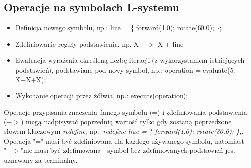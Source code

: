 \documentclass{article}
\begin{document}
\subsection{Operacje na symbolach L-systemu}
\begin{itemize}
    \item{Definicja nowego symbolu, np.: line = \{ forward(1.0); rotate(60.0); \};}
    \item{Zdefiniowanie reguły podstawienia, np. X $-$$>$ X + line;}
    \item{Ewaluacja wyrażenia określoną liczbę iteracji (z wykorzystaniem istniejących podstawień), podstawiane pod nowy symbol, np.: operation = evaluate(5, X+X+X);}
    \item{Wykonanie operacji przez żółwia, np.: execute(operation);}
\end{itemize}
Operacje przypisania znaczenia danego symbolu (=) i zdefiniowania podstawienia ($-$$>$) mogą nadpisywać poprzednią wartość tylko gdy zostaną poprzedzone słowem kluczowym \textit{redefine}, np.: \textit{redefine line = \{ forward(1.0); rotate(30.0); \};}. Operacja "=" musi być zdefiniowana dla każdego używanego symbolu, natomiast "$-$$>$"nie musi być zdefiniowana - symbol bez zdefiniowanych podstawień jest uznawany za terminalny. 
\end{document}

